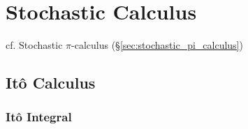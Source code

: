 \section{Stochastic Calculus}\label{sec:stochastic_calculus}


cf. Stochastic $\pi$-calculus (\S\ref{sec:stochastic_pi_calculus})



\subsection{It\^o Calculus}\label{sec:ito_calculus}

\subsubsection{It\^o Integral}\label{sec:ito_integral}
